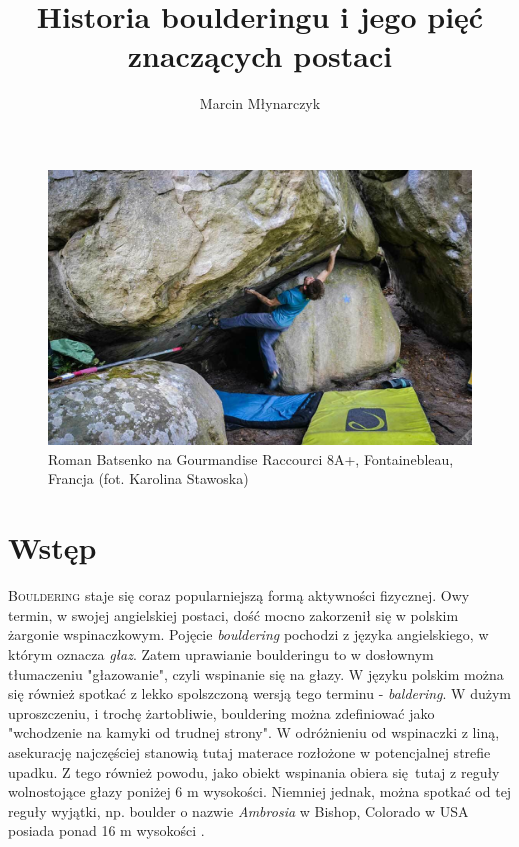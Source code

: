 \documentclass{article}
\title{Historia boulderingu i jego pięć znaczących postaci}
\author{Marcin Młynarczyk}
\date{\displaydate{date}}
\begin{document}
\maketitle
\tableofcontents

\bigskip

\begin{figure}[!htbp]
	\begin{center}
		\includegraphics[width=\linewidth]{images/intro.eps}
	\end{center}
	\caption{Roman Batsenko na Gourmandise Raccourci 8A+, Fontainebleau, Francja (fot. Karolina Stawoska) \cite{8a}}
\end{figure}

\section{Wstęp}
\lettrine[lines=2]{B}{ouldering} staje się coraz popularniejszą formą aktywności fizycznej. Owy termin, w swojej angielskiej postaci, dość mocno zakorzenił się w polskim żargonie wspinaczkowym. Pojęcie \textit{bouldering} pochodzi z języka angielskiego, w którym oznacza \textit{głaz}. Zatem uprawianie boulderingu to w dosłownym tłumaczeniu "głazowanie", czyli wspinanie się na głazy. W języku polskim można się również spotkać z lekko spolszczoną wersją tego terminu - \textit{baldering}. W dużym uproszczeniu, i trochę żartobliwie, bouldering można zdefiniować jako "wchodzenie na kamyki od trudnej strony". W odróżnieniu od wspinaczki z liną, asekurację najczęściej stanowią tutaj materace rozłożone w potencjalnej strefie upadku. Z tego również powodu, jako obiekt wspinania obiera się tutaj z reguły wolnostojące głazy poniżej 6 m wysokości. Niemniej jednak, można spotkać od tej reguły wyjątki, np. boulder o nazwie \textit{Ambrosia} w Bishop, Colorado w USA posiada ponad 16 m wysokości \cite{ambrosia}.
\end{document}
